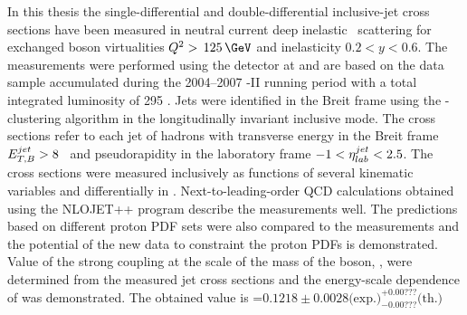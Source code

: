 In this thesis the single-differential and double-differential inclusive-jet cross sections have been measured in neutral current deep inelastic \ep\, scattering for exchanged boson virtualities $\qsq>\,125\,\GeV$ and inelasticity $0.2<y<0.6$. The measurements were performed using the \zeus detector at \hera and are based on the data sample accumulated during the 2004--2007 \hera-II running period with a total integrated luminosity of 295 \invpb. Jets were identified in the Breit frame using the \kt-clustering algorithm in the longitudinally invariant inclusive mode. The cross sections refer to each jet of hadrons with transverse energy in the Breit frame $\mbox{$E_{T,B}^{jet}$} > 8$ \GeV\, and pseudorapidity in the laboratory frame $-1<\mbox{$\eta^{jet}_{lab}$}<2.5$. The cross sections were measured inclusively as functions of several kinematic variables and differentially in \qsq. Next-to-leading-order QCD calculations obtained using the NLOJET++ program describe the measurements well. The predictions based on different proton PDF sets were also compared to the measurements and the potential of the new data to constraint the proton PDFs is demonstrated. Value of the strong coupling at the scale of the mass of the \zn boson, \asz, were determined from the measured jet cross sections and the energy-scale dependence of \as was demonstrated. The obtained value is \asz=$0.1218\pm 0.0028\text{(exp.)}^{+0.00???}_{-0.00???}\text{(th.)}$